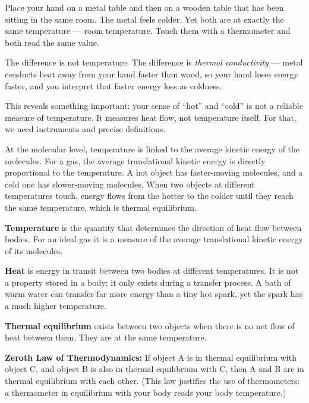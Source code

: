 Place your hand on a metal table and then on a wooden
table that has been sitting in the same room. The metal
feels colder. Yet both are at exactly the same
temperature --- room temperature. Touch them with a
thermometer and both read the same value.

The difference is not temperature. The difference is
\textit{thermal conductivity} --- metal conducts heat
away from your hand faster than wood, so your hand
loses energy faster, and you interpret that faster
energy loss as coldness.

This reveals something important: your sense of ``hot''
and ``cold'' is not a reliable measure of temperature.
It measures heat flow, not temperature itself. For
that, we need instruments and precise definitions.

At the molecular level, temperature is linked to the average
kinetic energy of the molecules. For a gas, the average translational
kinetic energy is directly proportional to the temperature. A hot
object has faster-moving molecules, and a cold one has slower-moving
molecules. When two objects at different temperatures touch, energy
flows from the hotter to the colder until they reach the same
temperature, which is thermal equilibrium.

\begin{definitionbox}
\textbf{Temperature} is the quantity that determines the direction
of heat flow between bodies. For an ideal gas it is a measure of the
average translational kinetic energy of its molecules.

\textbf{Heat} is energy in transit between two bodies
at different temperatures. It is not a property stored
in a body; it only exists during a transfer process.
A bath of warm water can transfer far more energy than a tiny hot
spark, yet the spark has a much higher temperature.

\textbf{Thermal equilibrium} exists between two
objects when there is no net flow of heat between
them. They are at the same temperature.

\textbf{Zeroth Law of Thermodynamics:} If object A
is in thermal equilibrium with object C, and object
B is also in thermal equilibrium with C, then A and
B are in thermal equilibrium with each other.
(This law justifies the use of thermometers: a
thermometer in equilibrium with your body reads your
body temperature.)
\end{definitionbox}

